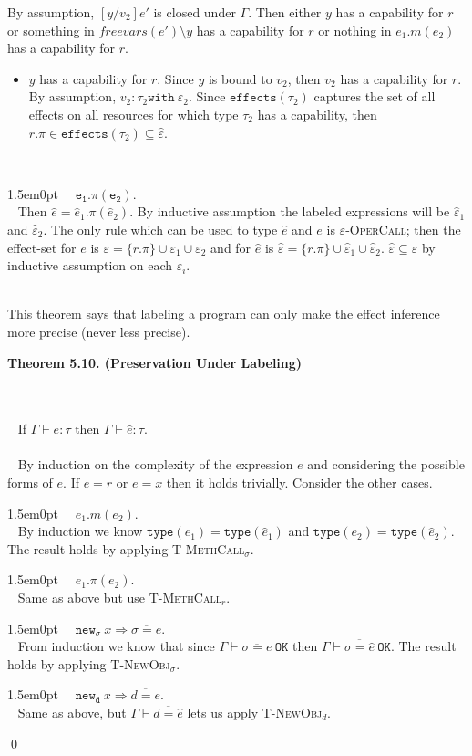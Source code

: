 \documentclass{llncs}
\newcommand{\keywadj}[1]{\mathtt{#1}}
\newcommand{\keyw}[1]{\keywadj{#1}~}
\newcommand{\thm}[3]{
	\begin{large}
		\bf{#1}
	\end{large} \\\\
	\fbox{Statement.} ~ #2
	\fbox{Proof.}~ #3 \qed
}
\newcommand{\proofcase}[2]{
	\begin{adjustwidth}{1.5em}{0pt}
		\fbox{Case.}~~#1. \\ ~#2
	\end{adjustwidth}
}
\begin{document}
{{{\noindent
By assumption, $[y/v_2]e'$ is closed under $\Gamma$. Then either $y$ has a capability for $r$ or something in $freevars(e') \setminus y$ has a capability for $r$ or nothing in $e_1.m(e_2)$ has a capability for $r$.
	\begin{itemize}
		\item $y$ has a capability for $r$. Since $y$ is bound to $v_2$, then $v_2$ has a capability for $r$. By assumption, $v_2 : \tau_2 \keyw{with} \varepsilon_2$. Since $\keywadj{effects}(\tau_2)$ captures the set of all effects on all resources for which type $\tau_2$ has a capability, then $r.\pi \in \keywadj{effects}(\tau_2) \subseteq \hat \varepsilon$.
	\end{itemize}
	
	~\\
}
\proofcase{$\keywadj{e_1.\pi(e_2)}$}{
	Then $\hat e = \hat e_1.\pi(\hat e_2)$. By inductive assumption the labeled expressions will be $\hat \varepsilon_1$ and $\hat \varepsilon_2$. The only rule which can be used to type $\hat e$ and $e$ is \textsc{$\varepsilon$-OperCall}; then the effect-set for $e$ is $\varepsilon = \{ r.\pi \} \cup \varepsilon_1 \cup \varepsilon_2$ and for $\hat e$ is $\hat \varepsilon = \{ r.\pi \} \cup \hat \varepsilon_1 \cup \hat \varepsilon_2$. $\hat \varepsilon \subseteq \varepsilon$ by inductive assumption on each $\varepsilon_i$.
}
}
}

\noindent
\\ This theorem says that labeling a program can only make the effect inference more precise (never less precise).\\






\thm{Theorem 5.10. (Preservation Under Labeling)}
{If $\Gamma \vdash e : \tau$ then $\Gamma \vdash \hat e : \tau$. \\\\}
{By induction on the complexity of the expression $e$ and considering the possible forms of $e$. If $e = r$ or $e = x$ then it holds trivially. Consider the other cases.

\proofcase{$e_1.m(e_2)$}{ 
By induction we know $\keywadj{type}(e_1) = \keywadj{type}(\hat e_1)$ and $\keywadj{type}(e_2) = \keywadj{type}(\hat e_2)$. The result holds by applying \textsc{T-MethCall$_\sigma$}.
}

\proofcase{$e_1.\pi(e_2)$}{
Same as above but use \textsc{T-MethCall$_r$}.
}

\proofcase{$\keyw{new_\sigma} x \Rightarrow \overline{\sigma = e}$}{ From induction we know that since $\Gamma \vdash \overline{\sigma = e}~\keywadj{OK}$ then $\Gamma \vdash \overline{\sigma = \hat e}~ \keywadj{OK}$. The result holds by applying \textsc{T-NewObj$_\sigma$}.
}

\proofcase{$\keyw{new_d} x \Rightarrow \overline{d = e}$}{ Same as above, but $\Gamma \vdash \overline{d = \hat e}$ lets us apply \textsc{T-NewObj$_d$}.
}
}
\end{document}
